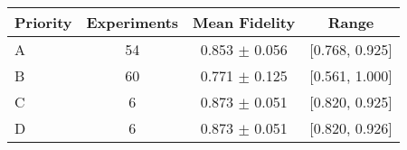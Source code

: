 \begin{tabular}{lccc}
\toprule
Priority & Experiments & Mean Fidelity & Range \\
\midrule
A & 54 & 0.853 $\pm$ 0.056 & [0.768, 0.925] \\
B & 60 & 0.771 $\pm$ 0.125 & [0.561, 1.000] \\
C & 6 & 0.873 $\pm$ 0.051 & [0.820, 0.925] \\
D & 6 & 0.873 $\pm$ 0.051 & [0.820, 0.926] \\
\bottomrule
\end{tabular}

